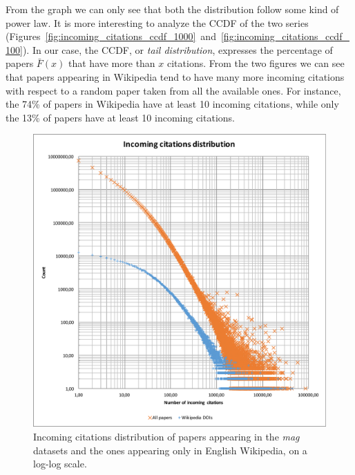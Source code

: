From the graph we can only see that both the distribution follow some kind of power law.
It is more interesting to analyze the \ac{CCDF} of the two series (Figures~\ref{fig:incoming_citations_ccdf_1000}~and~\ref{fig:incoming_citations_ccdf_100}).
In our case, the \ac{CCDF}, or \emph{tail distribution}, expresses the percentage of papers $\bar{F}(x)$ that have more than $x$ citations.
From the two figures we can see that papers appearing in Wikipedia tend to have many more incoming citations with respect to a random paper taken from all the available ones.
For instance, the 74\% of papers in Wikipedia have at least 10 incoming citations, while only the 13\% of papers have at least 10 incoming citations.


\begin{figure}[ht]
    \centering
    \includegraphics[keepaspectratio=true, width=\textwidth]{assets/incoming_cits_loglog}
    \caption{Incoming citations distribution of papers appearing in the \emph{mag} datasets and the ones appearing only in English Wikipedia, on a log-log scale.}
    \label{fig:incoming_citations_loglog}
\end{figure}


